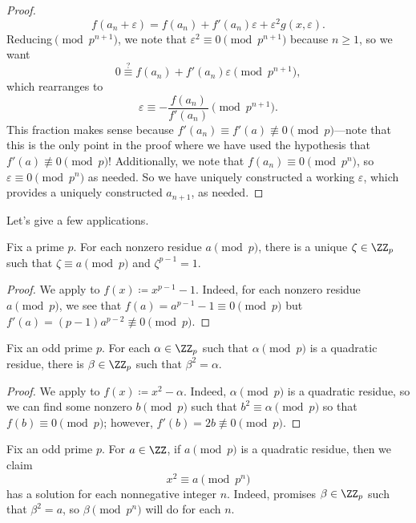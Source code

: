 \documentclass[../notes.tex]{subfiles}
\begin{document}
\begin{proof}
	\[f(a_n+\varepsilon)=f(a_n)+f'(a_n)\varepsilon+\varepsilon^2g(x,\varepsilon).\]
	Reducing$\pmod{p^{n+1}}$, we note that $\varepsilon^2\equiv0\pmod{p^{n+1}}$ because $n\ge1$, so we want
	\[0\stackrel?\equiv f(a_n)+f'(a_n)\varepsilon\pmod{p^{n+1}},\]
	which rearranges to
	\[\varepsilon\equiv-\frac{f(a_n)}{f'(a_n)}\pmod{p^{n+1}}.\]
	This fraction makes sense because $f'(a_n)\equiv f'(a)\not\equiv0\pmod p$---note that this is the only point in the proof where we have used the hypothesis that $f'(a)\not\equiv0\pmod p$! Additionally, we note that $f(a_n)\equiv0\pmod{p^n}$, so $\varepsilon\equiv0\pmod{p^n}$ as needed. So we have uniquely constructed a working $\varepsilon$, which provides a uniquely constructed $a_{n+1}$, as needed.
\end{proof}
Let's give a few applications.
\begin{corollary}
	Fix a prime $p$. For each nonzero residue $a\pmod p$, there is a unique $\zeta\in\ZZ_p$ such that $\zeta\equiv a\pmod p$ and $\zeta^{p-1}=1$.
\end{corollary}
\begin{proof}
	We apply  to $f(x)\coloneqq x^{p-1}-1$. Indeed, for each nonzero residue $a\pmod p$, we see that $f(a)=a^{p-1}-1\equiv0\pmod p$ but $f'(a)=(p-1)a^{p-2}\not\equiv0\pmod p$.
\end{proof}
\begin{corollary} \label{cor:sqrt-zp}
	Fix an odd prime $p$. For each $\alpha\in\ZZ_p$ such that $\alpha\pmod p$ is a quadratic residue, there is $\beta\in\ZZ_p$ such that $\beta^2=\alpha$.
\end{corollary}
\begin{proof}
	We apply  to $f(x)\coloneqq x^2-\alpha$. Indeed, $\alpha\pmod p$ is a quadratic residue, so we can find some nonzero $b\pmod p$ such that $b^2\equiv\alpha\pmod p$ so that $f(b)\equiv0\pmod p$; however, $f'(b)=2b\not\equiv0\pmod p$.
\end{proof}
\begin{example}
	Fix an odd prime $p$. For $a\in\ZZ$, if $a\pmod p$ is a quadratic residue, then we claim
	\[x^2\equiv a\pmod{p^n}\]
	has a solution for each nonnegative integer $n$. Indeed,  promises $\beta\in\ZZ_p$ such that $\beta^2=a$, so $\beta\pmod{p^n}$ will do for each $n$.
\end{example}
\end{document}

